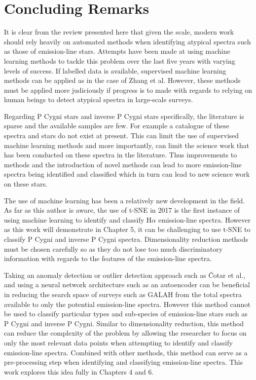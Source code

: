 \section{Concluding Remarks}

It is clear from the review presented here that given the scale, modern work should rely heavily on automated methods when identifying atypical spectra such as those of emission-line stars. Attempts have been made at using machine learning methods to tackle this problem over the last five years with varying levels of success. If labelled data is available, supervised machine learning methods can be applied as in the case of Zhang et al. However, these methods must be applied more judiciously if progress is to made with regards to relying on human beings to detect atypical spectra in large-scale surveys.

Regarding P Cygni stars and inverse P Cygni stars specifically, the literature is sparse and the available samples are few. For example a catalogue of these spectra and stars do not exist at present. This can limit the use of supervised machine learning methods and more importantly, can limit the science work that has been conducted on these spectra in the literature. Thus improvements to methods and the introduction of novel methods can lead to more emission-line spectra being identified and classified which in turn can lead to new science work on these stars. 

The use of machine learning has been a relatively new development in the field. As far as this author is aware, the use of t-SNE in 2017 is the first instance of using machine learning to identify and classify H$\alpha$ emission-line spectra. However as this work will demonstrate in Chapter 5, it can be challenging to use t-SNE to classify P Cygni and inverse P Cygni spectra. Dimensionality reduction methods must be chosen carefully so as they do not lose too much discriminatory information with regards to the features of the emission-line spectra.

Taking an anomaly detection or outlier detection approach such as Čotar et al., and using a neural network architecture such as an autoencoder can be beneficial in reducing the search space of surveys such as GALAH from the total spectra available to only the potential emission-line spectra. However this method cannot be used to classify particular types and sub-species of emission-line stars such as P Cygni and inverse P Cygni. Similar to dimensionality reduction, this method can reduce the complexity of the problem by allowing the researcher to focus on only the most relevant data points when attempting to identify and classify emission-line spectra. Combined with other methods, this method can serve as a pre-processing step when identifying and classifying emission-line spectra. This work explores this idea fully in Chapters 4 and 6. 

